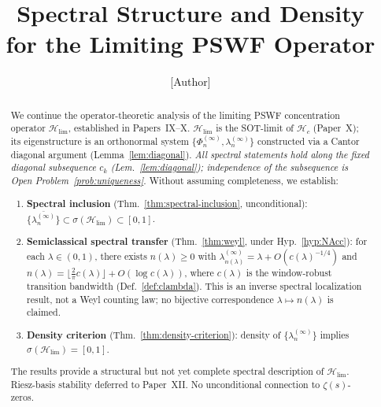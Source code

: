\documentclass[12pt,a4paper]{amsart}
\theoremstyle{definition}
\theoremstyle{remark}
\newcommand{\Hc}{\mathcal{H}_c}
\newcommand{\Hlim}{\mathcal{H}_{\lim}}
\begin{document}
\title[Spectral Structure of the Limiting PSWF Operator]{%
  Spectral Structure and Density\\
  for the Limiting PSWF Operator}

\author{[Author]}
\address{[Address]}
\email{[Email]}

\maketitle

\begin{abstract}
We continue the operator-theoretic analysis of the limiting PSWF
concentration operator $\Hlim$, established in Papers~IX--X.
$\Hlim$ is the SOT-limit of $\Hc$ (Paper~X);
its eigenstructure is an orthonormal system
$\{\Phi_n^{(\infty)},\lambda_n^{(\infty)}\}$
constructed via a Cantor diagonal argument
(Lemma~\ref{lem:diagonal}).
\emph{All spectral statements hold along
the fixed diagonal subsequence $c_k$
(Lem.~\ref{lem:diagonal}); independence
of the subsequence is Open
Problem~\ref{prob:uniqueness}.}
Without assuming completeness, we establish:
\begin{enumerate}
\item \textbf{Spectral inclusion}
      (Thm.~\ref{thm:spectral-inclusion}, unconditional):
      $\overline{\{\lambda_n^{(\infty)}\}}
      \subset\sigma(\Hlim)\subset[0,1]$.
\item \textbf{Semiclassical spectral transfer}
      (Thm.~\ref{thm:weyl},
      under Hyp.~\ref{hyp:NAcc}):
      for each $\lambda\in(0,1)$,
      there exists $n(\lambda)\ge 0$ with
      $\lambda_{n(\lambda)}^{(\infty)}
      = \lambda + O(c(\lambda)^{-1/4})$
      and
      $n(\lambda)
      = \lfloor\tfrac{2}{\pi}c(\lambda)\rfloor
        + O(\log c(\lambda))$,
      where $c(\lambda)$ is the
      window-robust transition bandwidth
      (Def.~\ref{def:clambda}).
      This is an inverse spectral localization
      result, not a Weyl counting law;
      no bijective correspondence
      $\lambda\mapsto n(\lambda)$ is claimed.
\item \textbf{Density criterion}
      (Thm.~\ref{thm:density-criterion}):
      density of $\{\lambda_n^{(\infty)}\}$
      implies $\sigma(\Hlim)=[0,1]$.
\end{enumerate}
The results provide a structural but not yet
complete spectral description of $\Hlim$.
Riesz-basis stability deferred to Paper~XII.
No unconditional connection to $\zeta(s)$-zeros.
\end{abstract}
\end{document}
